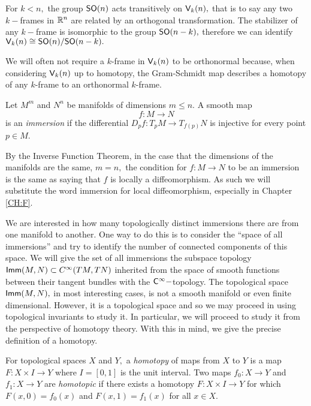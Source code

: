 For $k < n,$ the group ${\sf SO}(n)$ acts transitively on $\mathsf V_{k}(n),$ that is to say any two $k-$frames in $\mathbb R^{n}$ are related by an orthogonal transformation. The stabilizer of any $k-$frame is isomorphic to the group ${\sf SO}(n - k),$ therefore we can identify $\mathsf V_{k}(n) \cong {\sf SO}(n)/{\sf SO}(n - k).$ 

\begin{remark}
We will often not require a $k$-frame in $\mathsf V_{k}(n)$ to be orthonormal because, when considering $\mathsf V_{k}(n)$ up to homotopy, the Gram-Schmidt map describes a homotopy of any $k$-frame to an orthonormal $k$-frame.
\end{remark}


\begin{definition} \label{immdef}
Let $M^{m}$ and $N^{n}$ be manifolds of dimensions $m \leq n.$ A smooth map 
\[
f \colon M \longrightarrow N
\] 
is an \textit{immersion} if the differential $D_{p}f \colon T_{p}M \longrightarrow T_{f(p)}N$ is injective for every point $p \in M$.
\end{definition}

\begin{remark}
By the Inverse Function Theorem, in the case that the dimensions of the manifolds are the same, $m = n,$ the condition for $f \colon M \rightarrow N$ to be an immersion is the same as saying that $f$ is locally a diffeomorphism. As such we will substitute the word immersion for local diffeomorphism, especially in Chapter \ref{CH:F}.
\end{remark}

We are interested in how many topologically distinct immersions there are from one manifold to another. One way to do this is to consider the ``space of all immersions'' and try to identify the number of connected components of this space. We will give the set of all immersions the subspace topology ${\sf Imm}(M, N) \subset C^{\infty}(TM, TN)$ inherited from the space of smooth functions between their tangent bundles with the ${\sf C}^{\infty}-$topology. The topological space ${\sf Imm}(M, N),$ in most interesting cases, is not a smooth manifold or even finite dimensional. However, it is a topological space and so we may proceed in using topological invariants to study it. In particular, we will proceed to study it from the perspective of homotopy theory. With this in mind, we give the precise definition of a homotopy.


\begin{definition}
For topological spaces $X$ and $Y,$ a \textit{homotopy} of maps from $X$ to $Y$ is a map $F\colon X \times I \rightarrow Y$ where $I = [0, 1]$ is the unit interval. Two maps $f_{0} \colon X \rightarrow Y$ and $f_{1} \colon X \rightarrow Y$ are \textit{homotopic} if there exists a homotopy $F: X \times I \rightarrow Y$ for which $F(x, 0) = f_{0}(x)$ and $F(x, 1) = f_{1}(x)$ for all $x \in X.$
\end{definition} 


